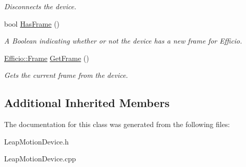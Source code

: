 \begin{DoxyCompactItemize}
\begin{DoxyCompactList}\small\item\em Disconnects the device. \end{DoxyCompactList}\item 
bool \hyperlink{class_efficio_1_1_leap_motion_device_ad5a6c2c51426dd7544912d0d729984f6}{Has\+Frame} ()\hypertarget{class_efficio_1_1_leap_motion_device_ad5a6c2c51426dd7544912d0d729984f6}{}\label{class_efficio_1_1_leap_motion_device_ad5a6c2c51426dd7544912d0d729984f6}

\begin{DoxyCompactList}\small\item\em A Boolean indicating whether or not the device has a new frame for Efficio. \end{DoxyCompactList}\item 
\hyperlink{class_efficio_1_1_frame}{Efficio\+::\+Frame} \hyperlink{class_efficio_1_1_leap_motion_device_aebd0b9579f668aa92b0556e8b8687042}{Get\+Frame} ()\hypertarget{class_efficio_1_1_leap_motion_device_aebd0b9579f668aa92b0556e8b8687042}{}\label{class_efficio_1_1_leap_motion_device_aebd0b9579f668aa92b0556e8b8687042}

\begin{DoxyCompactList}\small\item\em Gets the current frame from the device. \end{DoxyCompactList}\end{DoxyCompactItemize}
\subsection*{Additional Inherited Members}


The documentation for this class was generated from the following files\+:\begin{DoxyCompactItemize}
\item 
Leap\+Motion\+Device.\+h\item 
Leap\+Motion\+Device.\+cpp\end{DoxyCompactItemize}
